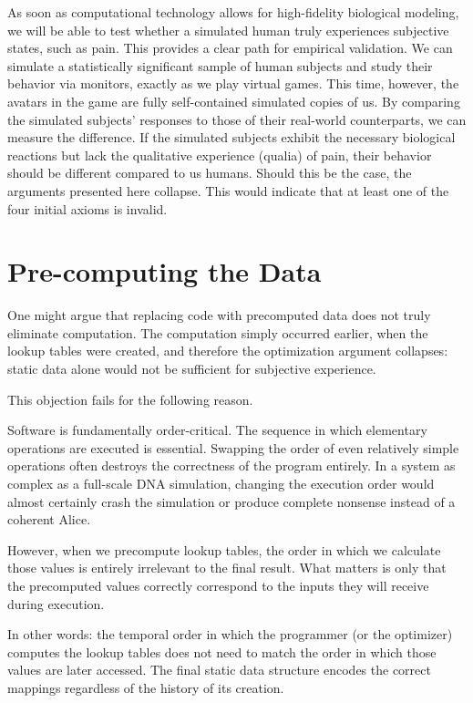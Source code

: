 As soon as computational technology allows for high-fidelity biological modeling, we will be able to test whether a simulated human truly experiences subjective states, such as pain.
This provides a clear path for empirical validation.
We can simulate a statistically significant sample of human subjects and study their behavior via monitors, exactly as we play virtual games.
This time, however, the avatars in the game are fully self-contained simulated copies of us.
By comparing the simulated subjects' responses to those of their real-world counterparts, we can measure the difference.
If the simulated subjects exhibit the necessary biological reactions but lack the qualitative experience (qualia) of pain, their behavior should be different compared to us humans.
Should this be the case, the arguments presented here collapse. This would indicate that at least one of the four initial axioms is invalid.



\section{Pre-computing the Data}

One might argue that replacing code with precomputed data does not truly eliminate computation. The computation simply occurred earlier, when the lookup tables were created, and therefore the optimization argument collapses: static data alone would not be sufficient for subjective experience.

This objection fails for the following reason.

Software is fundamentally order-critical. The sequence in which elementary operations are executed is essential.
Swapping the order of even relatively simple operations often destroys the correctness of the program entirely.
In a system as complex as a full-scale DNA simulation, changing the execution order would almost certainly crash the simulation or produce complete nonsense instead of a coherent Alice.

However, when we precompute lookup tables, the order in which we calculate those values is entirely irrelevant to the final result.
What matters is only that the precomputed values correctly correspond to the inputs they will receive during execution. 

In other words: the temporal order in which the programmer (or the optimizer) computes the lookup tables does not need to match the order in which those values are later accessed.
The final static data structure encodes the correct mappings regardless of the history of its creation.

